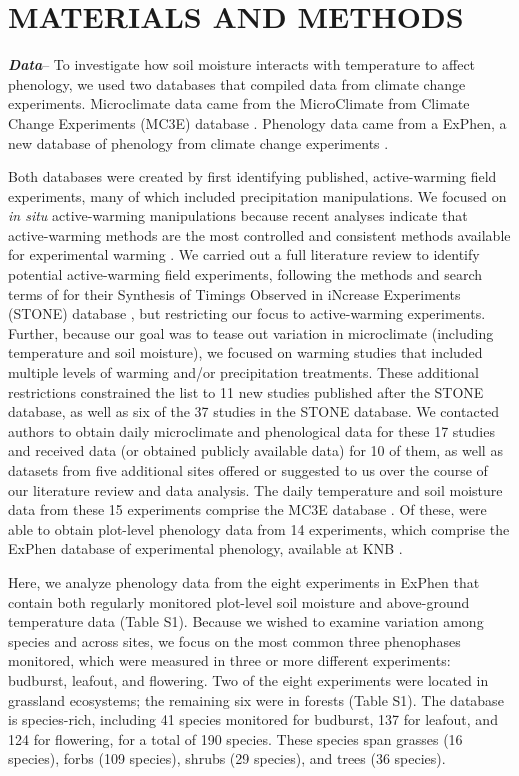 \documentclass{article}
\begin{document}
\section* {MATERIALS AND METHODS}
\textbf {\emph{Data}}-- To investigate how soil moisture interacts with temperature to affect phenology, we used two databases that compiled data from climate change experiments. Microclimate data came from the MicroClimate from Climate Change Experiments (MC3E) database \citep{ettinger2018, ettinger2019}. Phenology data came from a ExPhen, a new database of phenology from climate change experiments \citep{ettinger2022}. 
\par Both databases were created by first identifying published, active-warming field experiments, many of which included precipitation manipulations. We focused on \textit{in situ} active-warming manipulations because recent analyses indicate that active-warming methods are the most controlled and consistent methods available for experimental warming \citep{kimball2005,kimball2008,aronson2009,wolkovich2012a}. We carried out a full literature review to identify potential active-warming field experiments, following the methods and search terms of \citet{wolkovich2012a} for their Synthesis of Timings Observed in iNcrease Experiments (STONE) database \citep{wolkovich2012}, but restricting our focus to active-warming experiments. Further, because our goal was to tease out variation in microclimate (including temperature and soil moisture), we focused on warming studies that included multiple levels of warming and/or precipitation treatments. These additional restrictions constrained the list to 11 new studies published after the STONE database, as well as six of the 37 studies in the STONE database. We contacted authors to obtain daily microclimate and phenological data for these 17 studies and received data (or obtained publicly available data) for 10 of them, as well as datasets from five additional sites offered or suggested to us over the course of our literature review and data analysis. The daily temperature and soil moisture data from these 15 experiments comprise the MC3E database \citep{ettinger2018,ettinger2019}. Of these, were able to obtain plot-level phenology data from 14 experiments, which comprise the ExPhen database of experimental phenology, available at KNB \citep{ettinger2022}. 
\par Here, we analyze phenology data from the eight experiments in ExPhen that contain both regularly monitored plot-level soil moisture and above-ground temperature data (Table S1). Because we wished to examine variation among species and across sites, we focus on the most common three phenophases monitored, which were measured in three or more different experiments: budburst, leafout, and flowering. Two of the eight experiments were located in grassland ecosystems; the remaining six were in forests (Table S1). The database is species-rich, including 41 species monitored for budburst, 137 for leafout, and 124 for flowering, for a total of 190 species. These species span grasses (16 species), forbs (109 species), shrubs (29 species), and trees (36 species). 
\end{document}
